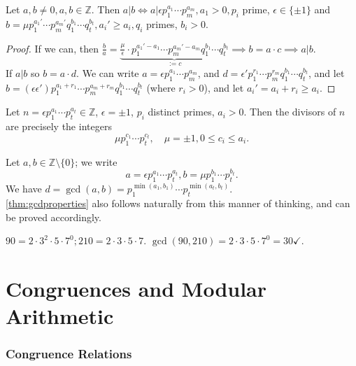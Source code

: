 \documentclass[12pt,oneside]{article}
\begin{document}
\begin{proposition}
  Let $a,b \neq 0, a,b \in \mathbb{Z}$. Then $a|b \iff a| \epsilon p_1^{a_1} \cdots p_m^{a_m}, a_1 > 0, p_i$ prime, $\epsilon \in \{\pm 1\}$ and $b = \mu p_1^{a_1'} \cdots p_m^{a_m'}q_1^{b_1}\cdots q_t^{b_t},a_i' \geq a_i, q_i$ primes, $b_i > 0$.
\end{proposition}

\begin{proof}
  If we can, then $\frac{b}{a} = \underbrace{\frac{\mu}{\epsilon} \cdot p_1^{a_1'-a_1}\cdots p_m^{a_m'-a_m}q_1^{b_1}\cdots q_t^{b_t}}_{:=c} \implies b = a \cdot c \implies a|b$.\\
  If $a|b$ so $b = a \cdot d$. We can write $a = \epsilon p_1^{a_1}\cdots p_m^{a_m}$, and $d = \epsilon' p_1^{r_1}\cdots p_m^{r_m}q_1^{b_1}\cdots q_t^{b_t}$, and let $b = (\epsilon \epsilon ')p_1^{a_1 + r_1} \cdots p_m^{a_m+r_m} q_1^{b_1}\cdots q_t^{b_t}$ (where $r_i > 0$), and let $a_i' = a_i+r_i \geq a_i$.
\end{proof}

\begin{corollary}
  Let $n = \epsilon p_1^{a_1}\cdots p_t^{a_t} \in \mathbb{Z}$, $\epsilon = \pm 1$, $p_i$ distinct primes, $a_i > 0$. Then the divisors of $n$ are precisely the integers \[\mu p_1^{c_1}\cdots p_t^{c_t}, \quad \mu = \pm 1, 0 \leq c_i \leq a_i.\]
\end{corollary}

\begin{remark}
  Let $a,b \in \mathbb{Z}\setminus \{0\}$; we write \[a = \epsilon p_1 ^{a_1} \cdots p_t^{a_t}, b = \mu p_1^{b_1}\cdots p_t^{b_t}.\] We have $d = \gcd(a,b) = p_1^{\min(a_1,b_1)}\cdots p_t^{\min(a_t,b_t)}$.\\
  \cref{thm:gcdproperties} also follows naturally from this manner of thinking, and can be proved accordingly.
\end{remark}

\begin{example}
  $90 = 2 \cdot 3^2 \cdot 5 \cdot 7^0; 210 = 2 \cdot 3 \cdot 5 \cdot 7$. $\gcd(90,210) = 2 \cdot 3 \cdot 5 \cdot 7^0 = 30\checkmark$.
\end{example}

\part{Congruences and Modular Arithmetic}

\section{Congruence Relations}
\end{document}
